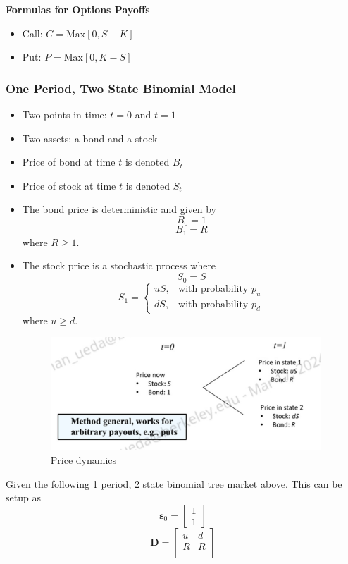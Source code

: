 \documentclass[11pt]{article}
\begin{document}
\textbf{Formulas for Options Payoffs}
\begin{itemize}
    \item Call: $C = \text{Max}[0, S-K]$
    \item Put: $P = \text{Max}[0, K-S]$
\end{itemize}

\subsubsection{One Period, Two State Binomial Model}
\begin{itemize}
    \item Two points in time: $t=0$ and $t=1$
    \item Two assets: a bond and a stock 
    \item Price of bond at time $t$ is denoted $B_t$
    \item Price of stock at time $t$ is denoted $S_t$
    \item The bond price is deterministic and given by 
    \[B_0 = 1\]
    \[B_1 = R\]
    where $R \ge 1$.
    \item The stock price is a stochastic process where 
    \[S_0 = S\]
    \[
    S_1 = \begin{cases}
        uS, & \text{with probability } p_u \\
        dS, & \text{with probability } p_d
    \end{cases}
    \] where $u \ge d$.

    \begin{figure}[H] 
        \centering 
        \includegraphics[width=4in]{imgs/one_period_two_state_bin_tree_model.png}
        \caption{Price dynamics}
    \end{figure}
\end{itemize}

Given the following 1 period, 2 state binomial tree market above.
This can be setup as 
    \[
    \boldsymbol{s}_0 = \begin{bmatrix}
        1 \\ 
        1
    \end{bmatrix}
    \]
    \[ 
    \boldsymbol{D} = \begin{bmatrix}
        u & d \\
        R & R \\
    \end{bmatrix}
    \]
\end{document}
